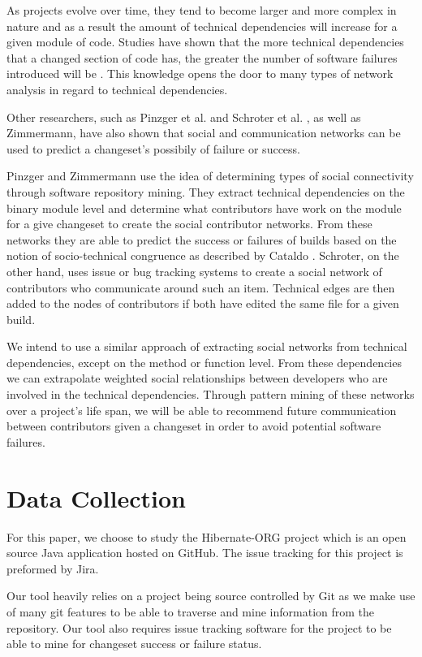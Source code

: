 \documentclass[conference]{IEEEtran}
\begin{document}
As projects evolve over time, they tend to become larger and more complex in nature and as
a result the amount of technical dependencies will increase for a given module of code.
Studies have shown that the more technical dependencies that a changed section of code has,
the greater the number of software failures introduced will be \cite{Zimmermann:2008:PDU}. 
This knowledge opens the door to many types of network analysis in regard to technical dependencies.

Other researchers, such as Pinzger et al. \cite{Pinzger:2008:DNP} and Schroter et al.
 \cite{Schroter:2010:PBO}, as well as Zimmermann\cite{Zimmermann:2008:PDU}, have also shown that
social and communication networks can be used to predict a changeset's possibily of failure or
success.

Pinzger and Zimmermann use the idea of determining types of social connectivity through 
software repository mining. They extract technical dependencies on the binary module level and
determine what contributors have work on the module for a give changeset to create the social
contributor networks. From these networks they are able to predict the success or failures of
builds based on the notion of socio-technical congruence as described by Cataldo \cite{Cataldo:2006:ICR}.
Schroter, on the other hand, uses issue or bug tracking systems to create a social network of
contributors who communicate around such an item. Technical edges are then added to the
nodes of contributors if both have edited the same file for a given build.

We intend to use a similar approach of extracting social networks from technical dependencies, 
except on the method or function level. From these dependencies we can extrapolate weighted
social relationships between developers who are involved in the technical dependencies. Through
pattern mining of these networks over a project's life span, we will be able to recommend future
communication between contributors given a changeset in order to avoid potential software
failures.


\section{Data Collection}
For this paper, we choose to study the Hibernate-ORG project which is an open source Java 
application hosted on GitHub. The issue tracking for this project is preformed by Jira.

Our tool heavily relies on a project being source controlled by Git as we make use of many
git features to be able to traverse and mine information from the repository. Our tool also
requires issue tracking software for the project to be able to mine for changeset success or
failure status.
\end{document}
